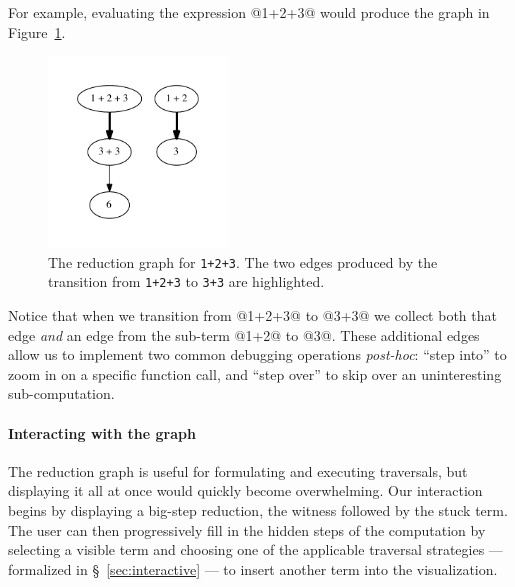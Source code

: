 For example, evaluating the expression @1+2+3@ would produce the
graph in Figure~\ref{fig:simple-reduction-hi}.
%
\begin{figure}[t]
  \centering
  \includegraphics[height=2in]{simple.pdf}
  \caption{The reduction graph for \texttt{1+2+3}. The two edges
    produced by the transition from \texttt{1+2+3} to \hbox{\texttt{3+3}}
    are highlighted.}
\label{fig:simple-reduction-hi}
\end{figure}
%
Notice that when we transition from @1+2+3@ to @3+3@ we collect
both that edge \emph{and} an edge from the sub-term @1+2@ to @3@.
%
These additional edges allow us to implement two common debugging
operations \emph{post-hoc}: ``step into'' to zoom in on a specific
function call, and ``step over'' to skip over an uninteresting
sub-computation.

\paragraph{Interacting with the graph}
The reduction graph is useful for formulating and executing traversals,
but displaying it all at once would quickly become overwhelming.
%
Our interaction begins by displaying a big-step reduction, \ie the
witness followed by the stuck term.
%
The user can then progressively fill in the hidden steps of the
computation by selecting a visible term and choosing one of the
applicable traversal strategies --- formalized in
\S~\ref{sec:interactive} --- to insert another term into the
visualization.


